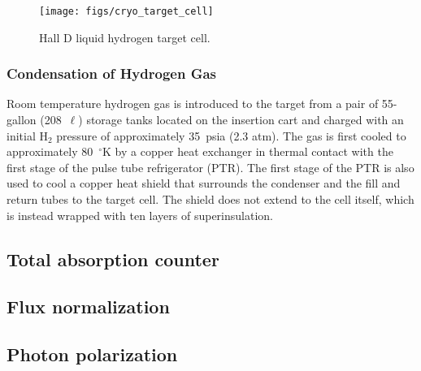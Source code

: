 
\begin{figure}[h]
\begin{center}
      \texttt{[image: figs/cryo\_target\_cell]}
\end{center}
\caption{
Hall D liquid hydrogen target cell.
\label{fig:tgt:cell}}
\end{figure}

 
\subsubsection[Condensation of Hydrogen Gas]{Condensation of Hydrogen Gas 
\label{sec:tgt:condens}}

Room temperature hydrogen gas is introduced to the target from a pair
of 55-gallon (208~$\ell$) storage tanks located on the insertion cart
and charged with an initial H$_2$ pressure of approximately 35~psia (2.3
atm).  The gas is first cooled to approximately 80~$^\circ$K by a copper heat
exchanger in thermal contact with the first stage of the pulse tube
refrigerator (PTR).  The first stage of the PTR is also used to cool a
copper heat shield that surrounds the condenser and the fill and
return tubes to the target cell.  The shield does not extend to the
cell itself, which is instead wrapped with ten layers of
superinsulation.





\subsection{Total absorption counter \label{sec:tac}}
\subsection{Flux normalization \label{sec:fluxnorm}}
\subsection{Photon polarization \label{sec:polarization}}